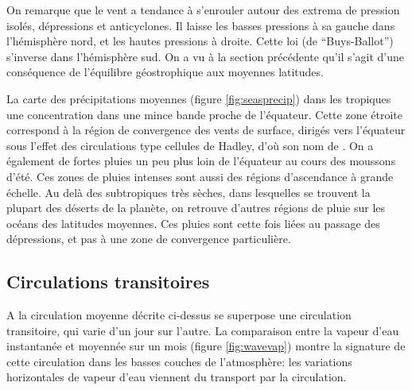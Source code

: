 \sk
On remarque que le vent a tendance à s'enrouler autour des extrema de pression isolés, dépressions et anticyclones. Il laisse les basses pressions à sa gauche dans l'hémisphère nord, et les hautes pressions à droite. Cette loi (de ``Buys-Ballot'') s'inverse dans l'hémisphère sud. On a vu à la section précédente qu'il s'agit d'une conséquence de l'équilibre géostrophique aux moyennes latitudes.


\sk
La carte des précipitations moyennes (figure \ref{fig:seasprecip}) dans les tropiques une concentration dans une mince bande proche de l'équateur. Cette zone étroite correspond à la région de convergence des vents de surface, dirigés vers l'équateur sous l'effet des circulations type cellules de Hadley, d'où son nom de . On a également de fortes pluies un peu plus loin de l'équateur au cours des moussons d'été. Ces zones de pluies intenses sont aussi des régions d'ascendance à grande échelle. Au delà des subtropiques très sèches, dans lesquelles se trouvent la plupart des déserts de la planète, on retrouve d'autres régions de pluie sur les océans des latitudes moyennes. Ces pluies sont cette fois liées au passage des dépressions, et pas à une zone de convergence particulière.


\sk
\subsection{Circulations transitoires}

\sk
A la circulation moyenne décrite ci-dessus se superpose une circulation transitoire, qui varie d'un jour sur l'autre. La comparaison entre la vapeur d'eau instantanée et moyennée sur un mois (figure \ref{fig:wavevap}) montre la signature de cette circulation dans les basses couches de l'atmosphère: les variations horizontales de vapeur d'eau viennent du transport par la circulation. 

